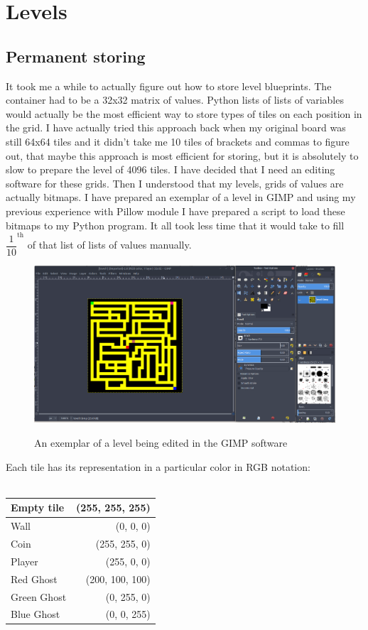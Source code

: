 \documentclass[11pt,a4paper]{report}
\newcommand{\dsubsection}[1]{\FloatBarrier \subsection{#1}}
\newenvironment{img}{
	\begin{center}
		\begin{figure}[H]
			\begin{center}
			
}{
	\end{center}
		\end{figure}
			\end{center}
}
\begin{document}
		\section{Levels}
		\label{Levels}
			\dsubsection{Permanent storing}
				\label{level-permanent-storing}
				It took me a while to actually figure out how to store level blueprints. The container had to be a 32x32 matrix of values. Python lists of lists of variables would actually be the most efficient way to store types of tiles on each position in the grid. I have actually tried this approach back when my original board was still 64x64 tiles and it didn't take me 10 tiles of brackets and commas to figure out, that maybe this approach is most efficient for storing, but it is absolutely to slow to prepare the level of 4096 tiles. I have decided that I need an editing software for these grids. Then I understood that my levels, grids of values are actually bitmaps. I have prepared an exemplar of a level in GIMP and using my previous experience with Pillow module I have prepared a script to load these bitmaps to my Python program. It all took less time that it would take to fill $\dfrac{1}{10}^{\text{th}}$ of that list of lists of values manually.
				\begin{img}
					\includegraphics[width=350pt]{images/gimp_level_editing}\\
					\caption{An exemplar of a level being edited in the GIMP software}
					\label{gimplevel}
				\end{img}
				Each tile has its representation in a particular color in RGB notation:\\ \\
				\begin{tabular}{| l | r |}
					\hline 
					Empty tile & (255, 255, 255) \\ \hline
					Wall & (0, 0, 0) \\ \hline
					Coin & (255, 255, 0) \\ \hline
					Player & (255, 0, 0) \\ \hline
					Red Ghost & (200, 100, 100) \\ \hline
					Green Ghost & (0, 255, 0) \\ \hline
					Blue Ghost & (0, 0, 255) \\ 
					\hline
				\end{tabular}
\end{document}
